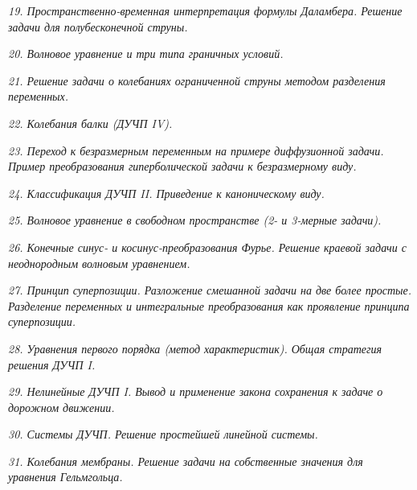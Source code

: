 \emph{19. Пространственно-временная интерпретация формулы Даламбера. Решение
задачи для полубесконечной струны.}

\newpage %

\emph{20. Волновое уравнение и три типа граничных условий.}

\newpage %

\emph{21. Решение задачи о колебаниях ограниченной струны методом разделения
переменных.}

\newpage %

\emph{22. Колебания балки (ДУЧП IV).}

\newpage %

\emph{23. Переход к безразмерным переменным на примере диффузионной задачи.
Пример преобразования гиперболической задачи к безразмерному виду.}

\newpage %

\emph{24. Классификация ДУЧП II. Приведение к каноническому виду.}

\newpage %

\emph{25. Волновое уравнение в свободном пространстве (2- и 3-мерные задачи).}

\newpage %

\emph{26. Конечные синус- и косинус-преобразования Фурье. Решение краевой задачи
с неоднородным волновым уравнением.}

\newpage %

\emph{27. Принцип суперпозиции. Разложение смешанной задачи на две более
простые. Разделение переменных и интегральные преобразования как проявление
принципа суперпозиции.}

\newpage %

\emph{28. Уравнения первого порядка (метод характеристик). Общая стратегия
решения ДУЧП I.}

\newpage %

\emph{29. Нелинейные ДУЧП I. Вывод и применение закона сохранения к задаче о
дорожном движении.}

\newpage %

\emph{30. Системы ДУЧП. Решение простейшей линейной системы.}

\newpage %

\emph{31. Колебания мембраны. Решение задачи на собственные значения для
уравнения Гельмгольца.}


